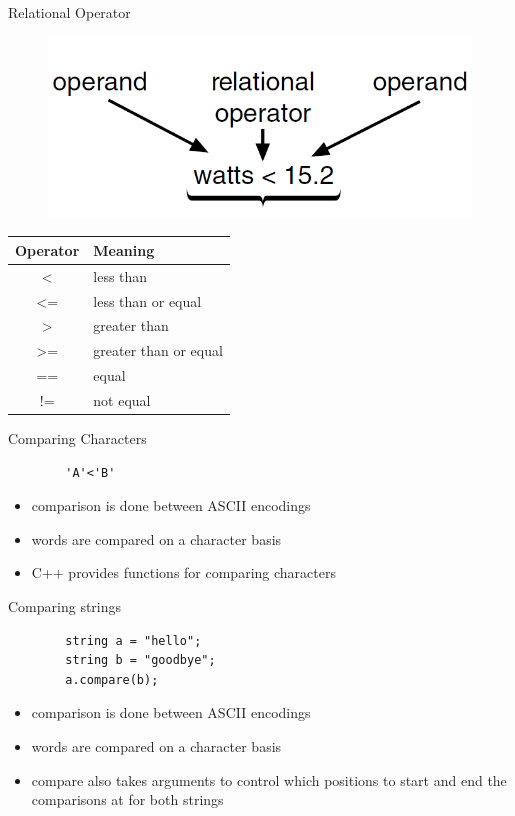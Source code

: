\documentclass[xcolor={dvipsnames}]{beamer}
\begin{document}
\begin{frame}{Relational Operator}
	\begin{figure}
		\includegraphics[width=.5\textwidth]{ops}
	\end{figure}
	\pause
	\begin{center}
	\begin{tabular}{|c|l|}
		\hline
		\textbf{Operator} & \textbf{Meaning}\\
		\hline
		\textless & less than \\
		\textless= & less than or equal \\
		\textgreater & greater than \\
		\textgreater= & greater than or equal \\
		== & equal  \\
		!= & not equal \\
		\hline
	\end{tabular}
	\end{center}
\end{frame}

\begin{frame}[fragile]{Comparing Characters}
	\begin{block}{}
	\begin{verbatim}
		'A'<'B'
	\end{verbatim}
	\end{block}
	\begin{block}{}
	\begin{itemize}
		\item comparison is done between ASCII encodings 
		\item words are compared on a character basis
		\item C++ provides functions for comparing characters
	\end{itemize}
	\end{block}
\end{frame}

\begin{frame}[fragile]{Comparing strings}
	\begin{block}{}
	\begin{verbatim}
		string a = "hello";
		string b = "goodbye";
		a.compare(b);
	\end{verbatim}
	\end{block}
	\begin{block}{}
	\begin{itemize}
		\item comparison is done between ASCII encodings 
		\item words are compared on a character basis
		\item compare also takes arguments to control which positions to start and end the comparisons at for both strings
	\end{itemize}
	\end{block}
\end{frame}
\end{document}
